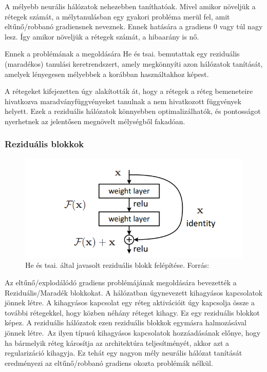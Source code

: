 \documentclass[12pt,a4]{article}
\begin{document}
    A mélyebb neurális hálózatok nehezebben taníthatóak. Mivel amikor növeljük a rétegek számát, a mélytanulásban egy gyakori probléma merül fel, amit eltűnő/robbanó gradiensnek neveznek. Ennek hatására a gradiens 0 vagy túl nagy lesz. Így amikor növeljük a rétegek számát, a hibaarány is nő. 
    
    Ennek a problémának a megoldására He és tsai. \cite{resnet} bemutattak egy reziduális (maradékos) tanulási keretrendszert, amely megkönnyíti azon hálózatok tanítását, amelyek lényegesen mélyebbek a korábban használtakhoz képest. 

     A rétegeket kifejezetten úgy alakították át, hogy a rétegek a réteg bemeneteire hivatkozva maradványfüggvényeket tanulnak a nem hivatkozott függvények helyett. Ezek a reziduális hálózatok könnyebben optimalizálhatók, és pontosságot nyerhetnek az jelentősen megnövelt mélységből fakadóan.

    \newpage
    \subsubsection{Reziduális blokkok}
    
    
    \begin{figure}[h]	
 		\centering
 		\includegraphics[width=1\linewidth]{Residual-Block}
 		\caption{He és tsai. által javasolt reziduális blokk felépítése.
 			Forrás:\cite{resnet}}
        \label{fig:resblock}
 	\end{figure}
  
    Az eltűnő/explodálódó gradiens problémájának megoldására bevezették a Reziduális/Maradék blokkokat. A hálózatban úgynevezett kihagyásos kapcsolatok jönnek létre. A kihagyásos kapcsolat egy réteg aktivációit úgy kapcsolja össze a további rétegekkel, hogy közben néhány réteget kihagy. Ez egy reziduális blokkot képez. A reziduális hálózatok ezen reziduális blokkok egymásra halmozásával jönnek létre. Az ilyen típusú kihagyásos kapcsolatok hozzáadásának előnye, hogy ha bármelyik réteg károsítja az architektúra teljesítményét, akkor azt a regularizáció kihagyja. Ez tehát egy nagyon mély neurális hálózat tanítását eredményezi az eltűnő/robbanó gradiens okozta problémák nélkül. 
\end{document}
